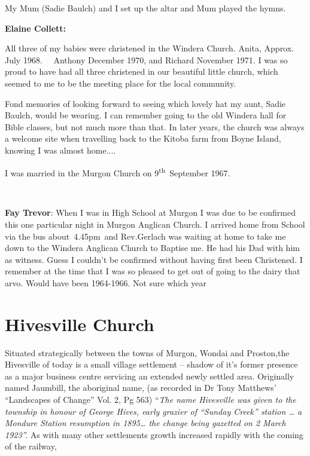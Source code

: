 My Mum (Sadie Baulch) and I set up the altar and Mum played the hymns.

\textbf{Elaine Collett:}

All three of my babies were christened in the Windera Church. Anita, Approx. July 1968.~~ Anthony December 1970, and Richard November 1971. I was so proud to have had all three christened in our beautiful little church, which seemed to me to be the meeting place for the local community.

Fond memories of looking forward to seeing which lovely hat my aunt, Sadie Baulch, would be wearing. I can remember going to the old Windera hall for Bible classes, but not much more than that. In later years, the church was always a welcome site when travelling back to the Kitoba farm from Boyne Island, knowing I was almost home.... ~

I was married in the Murgon Church on 9\textsuperscript{th}~September 1967.

~

\textbf{Fay Trevor}: When I was in High School at Murgon I was due to be confirmed this one particular night in Murgon Anglican Church. I arrived home from School via the bus about~4.45pm~and Rev.Gerlach was waiting at home to take me down to the Windera Anglican Church to Baptise me. He had his Dad with him as witness. Guess I couldn't be confirmed without having first been Christened. I remember at the time that I was so pleased to get out of going to the dairy that arvo. Would have been 1964-1966. Not sure which year

\hypertarget{hivesville-church}{%
\section{Hivesville Church}\label{hivesville-church}}

Situated strategically between the towns of Murgon, Wondai and Proston,the Hivesville of today is a small village settlement -- shadow of it's former presence as a major business centre servicing an extended newly settled area. Originally named Jaumbill, the aboriginal name, (as recorded in Dr Tony Matthews' ``Landscapes of Change'' Vol. 2, Pg 563) ``\emph{The name Hivesville was given to the township in honour of George Hives, early grazier of ``Sunday Creek'' station \ldots{} a Mondure Station resumption in 1895\ldots{} the change being gazetted on 2 March 1923''.} As with many other settlements growth increased rapidly with the coming of the railway,

